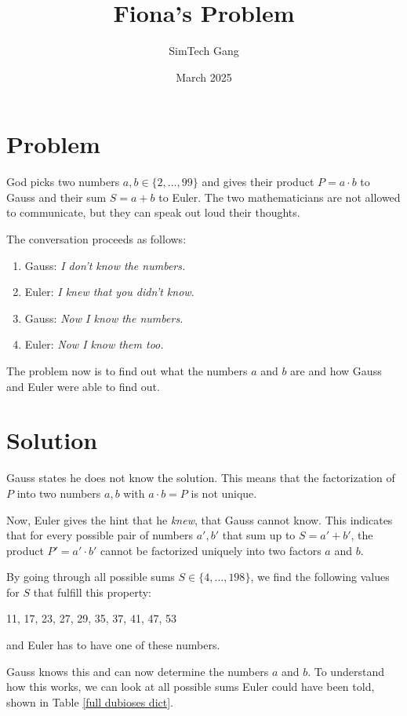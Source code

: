 \documentclass{article}
\title{Fiona's Problem}
\author{SimTech Gang}
\date{March 2025}
\begin{document}
\maketitle

\section{Problem}
God picks two numbers $a,b \in \{2,\ldots,99\}$ and gives their product $P = a\cdot b$ to Gauss and their sum $S = a+b$ to Euler. The two mathematicians are not allowed to communicate, but they can speak out loud their thoughts.

The conversation proceeds as follows:
\begin{enumerate}
\item Gauss: \emph{I don't know the numbers.}
\item Euler: \emph{I knew that you didn't know.}
\item Gauss: \emph{Now I know the numbers.}
\item Euler: \emph{Now I know them too.}
\end{enumerate}

The problem now is to find out what the numbers $a$ and $b$ are and how Gauss and Euler were able to find out.

\section{Solution}
Gauss states he does not know the solution. This means that the factorization of $P$ into two numbers $a,b$ with $a \cdot b = P$ is not unique.

Now, Euler gives the hint that he \emph{knew}, that Gauss cannot know. This indicates that for every possible pair of numbers $a',b'$ that sum up to $S = a' + b'$, the product $P' = a'\cdot b'$ cannot be factorized uniquely into two factors $a$ and $b$.


By going through all possible sums $S \in \{4,\ldots,198\}$, we find the following values for $S$ that fulfill this property:

11, 17, 23, 27, 29, 35, 37, 41, 47, 53

and Euler has to have one of these numbers.

Gauss knows this and can now determine the numbers $a$ and $b$. To understand how this works, we can look at all possible sums Euler could have been told, shown in Table \ref{full dubioses dict}.
\end{document}
